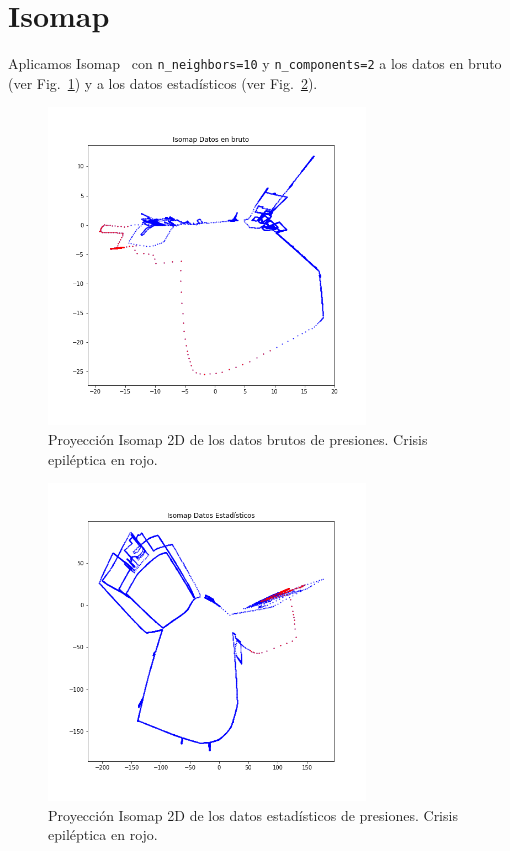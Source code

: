 \documentclass[a4paper,12pt,twoside,oldfontcommands]{memoir}
\begin{document}
\section{Isomap}
Aplicamos Isomap~\cite{tenenbaum2000global} con \texttt{n\_neighbors=10} y \texttt{n\_components=2} a los datos en bruto (ver Fig.~\ref{fig:isomapDB}) y a los datos estadísticos (ver Fig.~\ref{fig:isomapDE}). 
\begin{figure}
    \centering
    \includegraphics[width=0.75\textwidth]{images/isomapDB.png}
    \caption{Proyección Isomap 2D de los datos brutos de presiones. Crisis epiléptica en rojo.}
    \label{fig:isomapDB}
\end{figure}
\begin{figure}
    \centering
    \includegraphics[width=0.75\textwidth]{images/isomapDE.png}
    \caption{Proyección Isomap 2D de los datos estadísticos de presiones. Crisis epiléptica en rojo.}
    \label{fig:isomapDE}
\end{figure}
\end{document}
